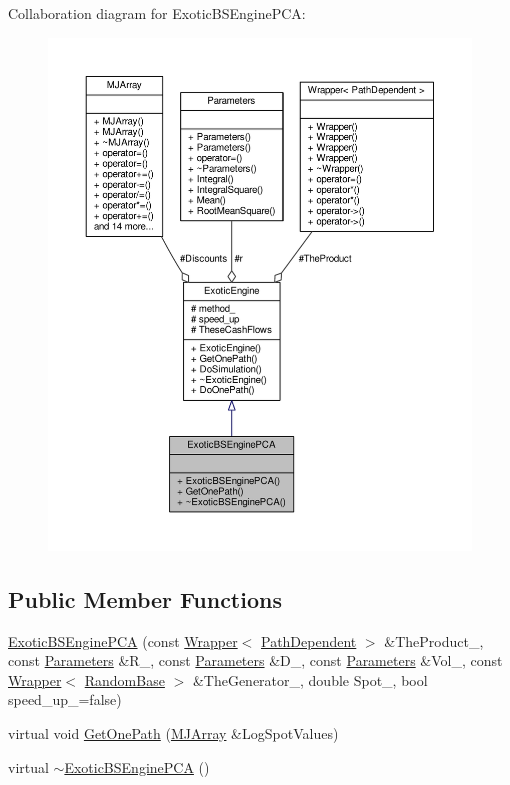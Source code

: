 Collaboration diagram for Exotic\+B\+S\+Engine\+P\+CA\+:
\nopagebreak
\begin{figure}[H]
\begin{center}
\leavevmode
\includegraphics[width=350pt]{classExoticBSEnginePCA__coll__graph}
\end{center}
\end{figure}
\subsection*{Public Member Functions}
\begin{DoxyCompactItemize}
\item 
\hyperlink{classExoticBSEnginePCA_ae91326f64b7a09fdf3d72383cad6dd8f}{Exotic\+B\+S\+Engine\+P\+CA} (const \hyperlink{classWrapper}{Wrapper}$<$ \hyperlink{classPathDependent}{Path\+Dependent} $>$ \&The\+Product\+\_\+, const \hyperlink{classParameters}{Parameters} \&R\+\_\+, const \hyperlink{classParameters}{Parameters} \&D\+\_\+, const \hyperlink{classParameters}{Parameters} \&Vol\+\_\+, const \hyperlink{classWrapper}{Wrapper}$<$ \hyperlink{classRandomBase}{Random\+Base} $>$ \&The\+Generator\+\_\+, double Spot\+\_\+, bool speed\+\_\+up\+\_\+=false)
\item 
virtual void \hyperlink{classExoticBSEnginePCA_ad34270f94895d699ff3d3a0ebc020e9f}{Get\+One\+Path} (\hyperlink{classMJArray}{M\+J\+Array} \&Log\+Spot\+Values)
\item 
virtual \hyperlink{classExoticBSEnginePCA_a6bff4b8aa95aef41294fb707c78d8331}{$\sim$\+Exotic\+B\+S\+Engine\+P\+CA} ()
\end{DoxyCompactItemize}

